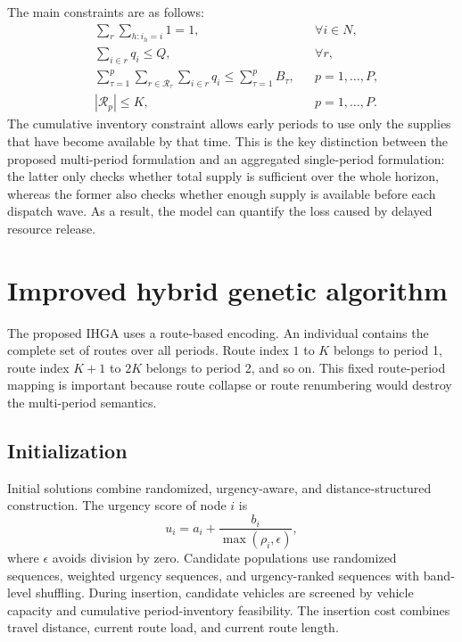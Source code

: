 ﻿\documentclass[preprint,12pt,authoryear]{elsarticle}
\begin{document}
The main constraints are as follows:
\begin{align}
&\sum_{r}\sum_{h:i_h=i}1=1, && \forall i\in N, \\
&\sum_{i\in r}q_i\le Q, && \forall r, \\
&\sum_{\tau=1}^{p}\sum_{r\in \mathcal{R}_{\tau}}\sum_{i\in r}q_i\le \sum_{\tau=1}^{p}B_{\tau}, && p=1,\ldots,P, \\
&|\mathcal{R}_{p}|\le K, && p=1,\ldots,P.
\end{align}
The cumulative inventory constraint allows early periods to use only the supplies that have become available by that time. This is the key distinction between the proposed multi-period formulation and an aggregated single-period formulation: the latter only checks whether total supply is sufficient over the whole horizon, whereas the former also checks whether enough supply is available before each dispatch wave. As a result, the model can quantify the loss caused by delayed resource release.

\section{Improved hybrid genetic algorithm}
\label{sec:algorithm}

The proposed IHGA uses a route-based encoding. An individual contains the complete set of routes over all periods. Route index $1$ to $K$ belongs to period 1, route index $K+1$ to $2K$ belongs to period 2, and so on. This fixed route-period mapping is important because route collapse or route renumbering would destroy the multi-period semantics.

\subsection{Initialization}

Initial solutions combine randomized, urgency-aware, and distance-structured construction. The urgency score of node $i$ is
\begin{equation}
u_i=a_i+\frac{b_i}{\max(\rho_i,\epsilon)},
\end{equation}
where $\epsilon$ avoids division by zero. Candidate populations use randomized sequences, weighted urgency sequences, and urgency-ranked sequences with band-level shuffling. During insertion, candidate vehicles are screened by vehicle capacity and cumulative period-inventory feasibility. The insertion cost combines travel distance, current route load, and current route length.
\end{document}
